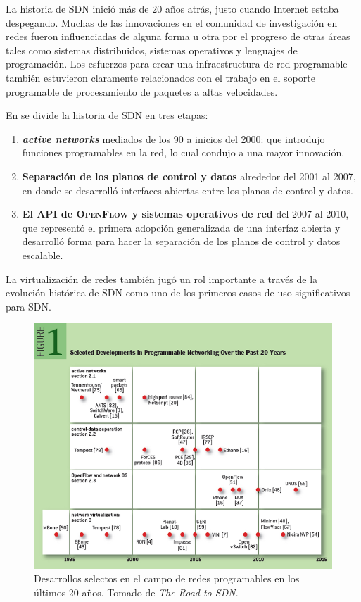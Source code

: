 \documentclass[10pt,journal,compsoc]{IEEEtran}
\begin{document}
La historia de SDN inició más de 20 años atrás, justo cuando Internet estaba despegando. Muchas de las innovaciones en el comunidad de investigación en redes fueron influenciadas de alguna forma u otra por el progreso de otras áreas tales como sistemas distribuidos, sistemas operativos y lenguajes de programación. Los esfuerzos para crear una infraestructura de red programable también estuvieron claramente relacionados con el trabajo en el soporte programable de procesamiento de paquetes a altas velocidades.

En \cite{rexford} se divide la historia de SDN en tres etapas: 
\begin{enumerate}
    \item \textbf{\emph{active networks}} mediados de los 90 a inicios del 2000: que introdujo funciones programables en la red, lo cual condujo a una mayor innovación.
    \item \textbf{Separación de los planos de control y datos} alrededor del 2001 al 2007, en donde se desarrolló interfaces abiertas entre los planos de control y datos.
    \item \textbf{El API de \textsc{OpenFlow} y sistemas operativos de red} del 2007 al 2010, que representó el primera adopción generalizada de una interfaz abierta y desarrolló forma para hacer la separación de los planos de control y datos escalable.
\end{enumerate}
La virtualización de redes también jugó un rol importante a través de la evolución histórica de SDN como uno de los primeros casos de uso significativos para SDN.

\begin{figure}[h]
    \center
    \includegraphics[width=15cm]{sdn-history}
    \caption{Desarrollos selectos en el campo de redes programables en los últimos 20 años. Tomado de \emph{The Road to SDN}\cite{rexford}.}
    \label{fig:tradicitional-architecture}
\end{figure}
\end{document}
